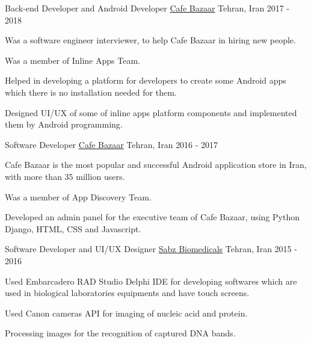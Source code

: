 

\begin{cventries}

 \cventry
    {Back-end Developer and Android Developer} %
    {\href{http://cafebazaar.ir}{Cafe Bazaar}} %
    {Tehran, Iran} %
    {2017 - 2018} %
    {
      \begin{cvitems} %
        \item {Was a software engineer interviewer, to help Cafe Bazaar in hiring new people.}
        \item {Was a member of Inline Apps Team.}
        \item {Helped in developing a platform for developers to create some Android apps which there is no installation needed for them.}
        \item {Designed UI/UX of some of inline apps platform components and implemented them by Android programming.}
      \end{cvitems}
    }

  \cventry
    {Software Developer} %
    {\href{http://cafebazaar.ir}{Cafe Bazaar}} %
    {Tehran, Iran} %
    {2016 - 2017} %
    {
      \begin{cvitems} %
        \item {Cafe Bazaar is the most popular and successful Android application store in Iran, with
more than 35 million users.}
        \item {Was a member of App Discovery Team.}
        \item {Developed an admin panel for the executive team of Cafe Bazaar, using Python Django, HTML, CSS and Javascript.}
      \end{cvitems}
    }

  \cventry
    {Software Developer and UI/UX Designer} %
    {\href{http://www.sabzbiomedicals.com/}{Sabz Biomedicals}} %
    {Tehran, Iran} %
    {2015 - 2016} %
    {
      \begin{cvitems} %
        \item {Used Embarcadero RAD Studio Delphi IDE for developing softwares which are used in biological laboratories equipments and have touch screens.}
        \item {Used Canon cameras API for imaging of nucleic acid and protein.}
        \item {Processing images for the recognition of captured DNA bands.}
      \end{cvitems}
    }


\end{cventries}
